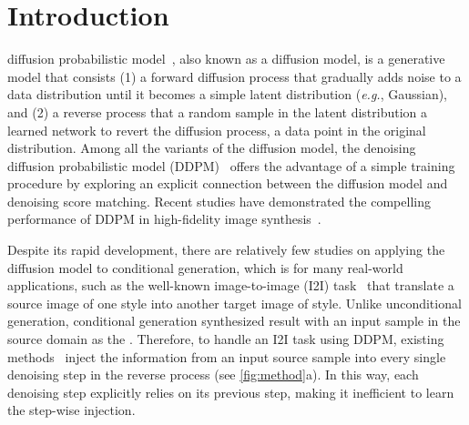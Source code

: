 \section{Introduction}\label{sec:intro}


 diffusion probabilistic model~\cite{sohl2015deep,ho2020denoising,song2020score,song2020denoising}, also known as a diffusion model, is a generative model that consists  (1) a forward diffusion process that gradually adds noise to a data distribution until it becomes a simple latent distribution (\textit{e.g.}, Gaussian), and (2) a reverse process that  a random sample in the latent distribution  a learned network to revert the diffusion process,  a data point in the original distribution. 
%
Among all the variants of the diffusion model, the denoising diffusion probabilistic model (DDPM)~\cite{ho2020denoising} offers the advantage of a simple training procedure by exploring an explicit connection between the diffusion model and denoising score matching.
%
Recent studies have demonstrated the compelling performance of DDPM in high-fidelity image synthesis~\cite{ho2020denoising, nichol2021improved, dhariwal2021diffusion}. %

Despite its rapid development, there are relatively few studies on applying the diffusion model to conditional generation, which is  for many real-world applications, such as the well-known image-to-image (I2I) task~\cite{isola2017image} that translate a source image of one style into another target image of  style.
%
Unlike unconditional generation, conditional generation  synthesized result with an input sample in the source domain as the . 
%
Therefore, to handle an I2I task using DDPM, existing methods~\cite{sasaki2021unit,saharia2021palette,choi2021ilvr,liu2021more,wang2022pretraining} inject the information from an input source sample into every single denoising step in the reverse process (see \cref{fig:method}a).
%
In this way, each denoising step explicitly relies on its previous step, making it inefficient to learn the step-wise injection.



% 

